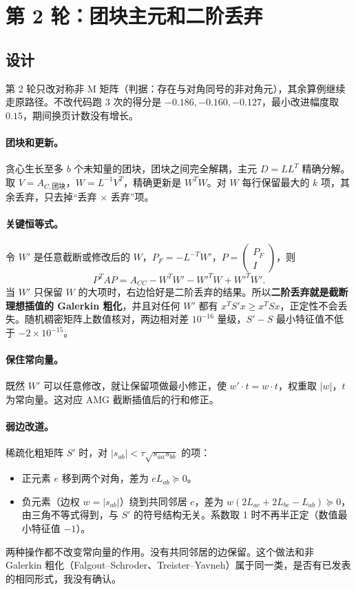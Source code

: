 \documentclass[11pt,a4paper]{ctexart}
\begin{document}
\section{第 2 轮：团块主元和二阶丢弃}
\subsection{设计}
第 2 轮只改对称非 M 矩阵（判据：存在与对角同号的非对角元），其余算例继续走原路径。不改代码跑 3 次的得分是 $-0.186,-0.160,-0.127$，最小改进幅度取 $0.15$，期间换页计数没有增长。

\paragraph{团块和更新。}贪心生长至多 $b$ 个未知量的团块，团块之间完全解耦，主元 $D=LL^T$ 精确分解。取 $V=A_{C,\text{团块}}$，$W=L^{-1}V^T$，精确更新是 $W^TW$。对 $W$ 每行保留最大的 $k$ 项，其余丢弃，只去掉“丢弃 $\times$ 丢弃”项。

\paragraph{关键恒等式。}令 $W'$ 是任意截断或修改后的 $W$，$P_F=-L^{-T}W'$，$P=\begin{pmatrix}P_F\\ I\end{pmatrix}$，则
\begin{equation}
P^TAP=A_{CC}-W^TW'-W'^TW+W'^TW'.
\end{equation}
当 $W'$ 只保留 $W$ 的大项时，右边恰好是二阶丢弃的结果。所以\textbf{二阶丢弃就是截断理想插值的 Galerkin 粗化}，并且对任何 $W'$ 都有 $x^TS'x\ge x^TSx$，正定性不会丢失。随机稠密矩阵上数值核对，两边相对差 $10^{-16}$ 量级，$S'-S$ 最小特征值不低于 $-2\times10^{-15}$。

\paragraph{保住常向量。}既然 $W'$ 可以任意修改，就让保留项做最小修正，使 $w'\cdot t=w\cdot t$，权重取 $|w|$，$t$ 为常向量。这对应 AMG 截断插值后的行和修正。

\paragraph{弱边改道。}稀疏化粗矩阵 $S'$ 时，对 $|s_{ab}|<\tau\sqrt{s_{aa}s_{bb}}$ 的项：
\begin{itemize}
\item 正元素 $e$ 移到两个对角，差为 $eL_{ab}\succeq0$。
\item 负元素（边权 $w=|s_{ab}|$）绕到共同邻居 $c$，差为 $w(2L_{ac}+2L_{bc}-L_{ab})\succeq0$，由三角不等式得到，与 $S'$ 的符号结构无关。系数取 1 时不再半正定（数值最小特征值 $-1$）。
\end{itemize}
两种操作都不改变常向量的作用。没有共同邻居的边保留。这个做法和非 Galerkin 粗化（Falgout--Schroder、Treister--Yavneh）属于同一类，是否有已发表的相同形式，我没有确认。
\end{document}
